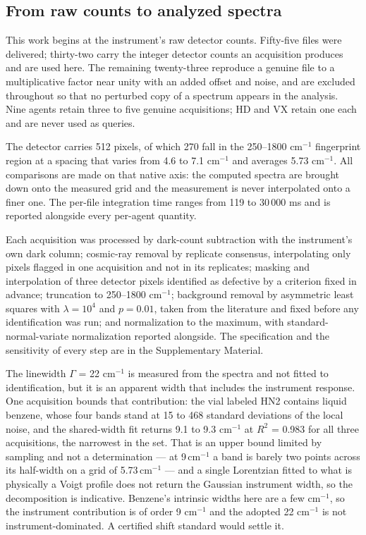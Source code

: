 \documentclass[review,12pt]{elsarticle}
\newcommand*\wn{\ensuremath{\text{cm}^{-1}}}
\begin{document}
\subsection{From raw counts to analyzed spectra}

This work begins at the instrument's raw detector counts. Fifty-five files were delivered; thirty-two carry the integer detector counts an acquisition produces and are used here. The remaining twenty-three reproduce a genuine file to a multiplicative factor near unity with an added offset and noise, and are excluded throughout so that no perturbed copy of a spectrum appears in the analysis. Nine agents retain three to five genuine acquisitions; HD and VX retain one each and are never used as queries.

The detector carries 512 pixels, of which 270 fall in the 250--1800 \wn{} fingerprint region at a spacing that varies from 4.6 to 7.1 \wn{} and averages 5.73 \wn{}. All comparisons are made on that native axis: the computed spectra are brought down onto the measured grid and the measurement is never interpolated onto a finer one. The per-file integration time ranges from 119 to 30\,000 ms and is reported alongside every per-agent quantity.

Each acquisition was processed by dark-count subtraction with the instrument's own dark column; cosmic-ray removal by replicate consensus, interpolating only pixels flagged in one acquisition and not in its replicates; masking and interpolation of three detector pixels identified as defective by a criterion fixed in advance; truncation to 250--1800 \wn{}; background removal by asymmetric least squares with $\lambda = 10^{4}$ and $p = 0.01$, taken from the literature and fixed before any identification was run; and normalization to the maximum, with standard-normal-variate normalization reported alongside. The specification and the sensitivity of every step are in the Supplementary Material.

The linewidth $\Gamma$ = 22 \wn{} is measured from the spectra and not fitted to identification, but it is an apparent width that includes the instrument response. One acquisition bounds that contribution: the vial labeled HN2 contains liquid benzene, whose four bands stand at 15 to 468 standard deviations of the local noise, and the shared-width fit returns 9.1 to 9.3 \wn{} at $R^2$ = 0.983 for all three acquisitions, the narrowest in the set. That is an upper bound limited by sampling and not a determination --- at 9\,\wn{} a band is barely two points across its half-width on a grid of 5.73\,\wn{} --- and a single Lorentzian fitted to what is physically a Voigt profile does not return the Gaussian instrument width, so the decomposition is indicative. Benzene's intrinsic widths here are a few \wn{}, so the instrument contribution is of order 9 \wn{} and the adopted 22 \wn{} is not instrument-dominated. A certified shift standard would settle it.
\end{document}
